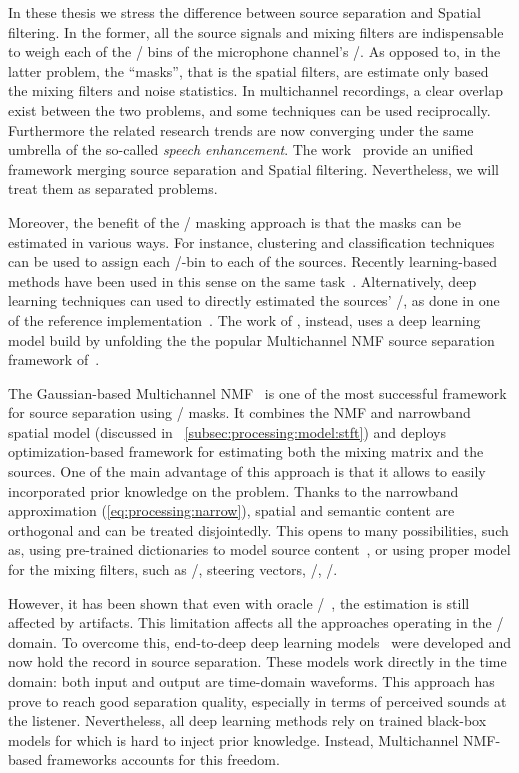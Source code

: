 In these thesis we stress the difference between source separation and Spatial filtering.
In the former, all the source signals and mixing filters are indispensable to weigh each of the \TF/ bins of the microphone channel's \STFT/.
As opposed to, in the latter problem, the ``masks'', that is the spatial filters, are estimate only based the mixing filters and noise statistics.
In multichannel recordings, a clear overlap exist between the two problems, and some techniques can be used reciprocally.
Furthermore the related research trends are now converging under the same umbrella of the so-called \textit{speech enhancement}.
The work~ provide an unified framework merging source separation and Spatial filtering.
Nevertheless, we will treat them as separated problems.

\mynewline
Moreover, the benefit of the \TF/ masking approach is that the masks can be estimated in various ways.
For instance, clustering and classification techniques~ can be used to assign each \TF/-bin to each of the sources.
Recently learning-based methods have been used in this sense on the same task~.
Alternatively, deep learning techniques can used to directly estimated the sources' \TF/, as done in one of the reference implementation~.
The work of , instead, uses a deep learning model build by unfolding the the popular Multichannel \ac{NMF} source separation framework of~.

\mynewline
The Gaussian-based Multichannel \ac{NMF}~ is one of the most successful framework for source separation using \TF/ masks.
It combines the \ac{NMF} and narrowband spatial model (discussed in ~\cref{subsec:processing:model:stft}) and deploys optimization-based framework for estimating both the mixing matrix and the sources.
One of the main advantage of this approach is that it allows to easily incorporated prior knowledge on the problem.
Thanks to the narrowband approximation (\cref{eq:processing:narrow}), spatial and semantic content are orthogonal and can be treated disjointedly.
This opens to many possibilities, such as, using pre-trained dictionaries to model source content~, or using proper model for the mixing filters, such as \RIRs/, steering vectors, \ReTFs/, \etc/.

\mynewline
However, it has been shown that even with oracle \TF/~, the estimation is still affected by artifacts.
This limitation affects all the approaches operating in the \TF/ domain.
To overcome this, end-to-deep deep learning models~ were developed and now hold the record in source separation.
These models work directly in the time domain: both input and output are time-domain waveforms.
This approach has prove to reach good separation quality, especially in terms of perceived sounds at the listener.
Nevertheless, all deep learning methods rely on trained black-box models for which is hard to inject prior knowledge.
Instead, Multichannel NMF-based frameworks accounts for this freedom.

